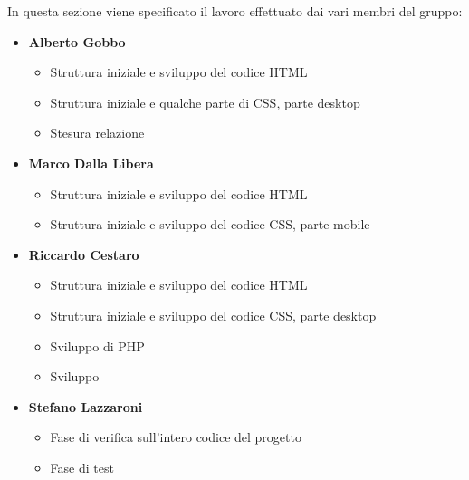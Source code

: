 In questa sezione viene specificato il lavoro effettuato dai vari membri del gruppo:
\begin{itemize}
	\item \textbf{Alberto Gobbo}
	\begin{itemize}
		\item Struttura iniziale e sviluppo del codice HTML
		\item Struttura iniziale e qualche parte di CSS, parte desktop 
		\item Stesura relazione
	\end{itemize}	
	\item \textbf{Marco Dalla Libera}
	\begin{itemize}
		\item Struttura iniziale e sviluppo del codice HTML
		\item Struttura iniziale e sviluppo del codice CSS, parte mobile
	\end{itemize}	
	\item \textbf{Riccardo Cestaro}
	\begin{itemize}
		\item Struttura iniziale e sviluppo del codice HTML
		\item Struttura iniziale e sviluppo del codice CSS, parte desktop
		\item Sviluppo di PHP
		\item Sviluppo 
	\end{itemize}	
	\item \textbf{Stefano Lazzaroni}
	\begin{itemize}
		\item Fase di verifica sull'intero codice del progetto
		\item Fase di test 
	\end{itemize}	
\end{itemize}	
